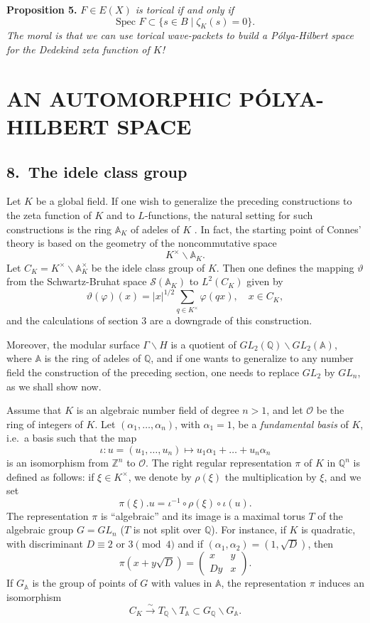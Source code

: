 \documentclass[12pt]{article}
\begin{document}
\medskip

\noindent
\textbf{Proposition 5.} \emph{$F \in E(X)$ is torical if and only if}
\[
\text{Spec } F \subset \{s \in B \mid \zeta_K(s) = 0\}.
\]
\emph{The moral is that we can use torical wave-packets to build a Pólya-Hilbert space for the Dedekind zeta function of $K$!}

\section*{AN AUTOMORPHIC PÓLYA-HILBERT SPACE}

\subsection*{8.\ The idele class group}

Let $K$ be a global field. If one wish to generalize the preceding constructions to the zeta function of $K$ and to $L$-functions, the natural setting for such constructions is the ring $\mathbb{A}_K$ of adeles of $K$ \cite{W}. In fact, the starting point of Connes' theory is based on the geometry of the noncommutative space
\[
K^{\times} \backslash \mathbb{A}_K.
\]
Let $C_K = K^{\times} \backslash \mathbb{A}_K^{\times}$ be the idele class group of $K$. Then one defines the mapping $\vartheta$ from the Schwartz-Bruhat space $\mathcal{S}(\mathbb{A}_K)$ to $L^2(C_K)$ given by
\[
\vartheta(\varphi)(x) = |x|^{1/2} \sum_{q \in K^{\times}} \varphi(qx), \quad x \in C_K,
\]
and the calculations of section 3 are a downgrade of this construction.

Moreover, the modular surface $\Gamma \backslash H$ is a quotient of $GL_2(\mathbb{Q}) \backslash GL_2(\mathbb{A})$, where $\mathbb{A}$ is the ring of adeles of $\mathbb{Q}$, and if one wants to generalize to any number field the construction of the preceding section, one needs to replace $GL_2$ by $GL_n$, as we shall show now.

Assume that $K$ is an algebraic number field of degree $n > 1$, and let $\mathcal{O}$ be the ring of integers of $K$. Let $(\alpha_1, \dots, \alpha_n)$, with $\alpha_1 = 1$, be a \emph{fundamental basis} of $K$, i.e.\ a basis such that the map
\[
\iota : u = (u_1, \dots, u_n) \mapsto u_1 \alpha_1 + \dots + u_n \alpha_n
\]
is an isomorphism from $\mathbb{Z}^n$ to $\mathcal{O}$. The right regular representation $\pi$ of $K$ in $\mathbb{Q}^n$ is defined as follows: if $\xi \in K^{\times}$, we denote by $\rho(\xi)$ the multiplication by $\xi$, and we set
\[
\pi(\xi).u = \iota^{-1} \circ \rho(\xi) \circ \iota(u).
\]
The representation $\pi$ is ``algebraic'' and its image is a maximal torus $T$ of the algebraic group $G = GL_n$ ($T$ is not split over $\mathbb{Q}$). For instance, if $K$ is quadratic, with discriminant $D \equiv 2$ or $3 \pmod 4$ and if $(\alpha_1, \alpha_2) = (1, \sqrt{D})$, then
\[
\pi(x + y\sqrt{D}) = \begin{pmatrix} x & y \\ Dy & x \end{pmatrix}.
\]
If $G_{\mathbb{A}}$ is the group of points of $G$ with values in $\mathbb{A}$, the representation $\pi$ induces an isomorphism
\[
C_K \xrightarrow{\sim} T_{\mathbb{Q}} \backslash T_{\mathbb{A}} \subset G_{\mathbb{Q}} \backslash G_{\mathbb{A}}.
\]
\end{document}
